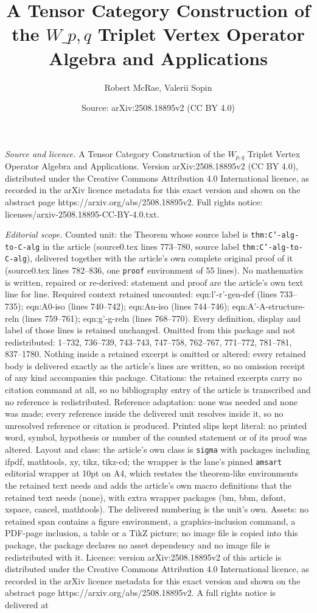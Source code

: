 \documentclass[10pt,a4paper]{amsart}
\title[A Tensor Category Construction of the $W\_{p,q}$ Triplet Vert]{A Tensor Category Construction of the $W\_{p,q}$ Triplet Vertex Operator Algebra and Applications}
\author{Robert McRae, Valerii Sopin}
\date{Source: arXiv:2508.18895v2 (CC BY 4.0)}
\begin{document}
\maketitle

\noindent\emph{Source and licence.} A Tensor Category Construction of the $W_{p,q}$ Triplet Vertex Operator Algebra and Applications. Version arXiv:2508.18895v2 (CC BY 4.0), distributed under the Creative Commons Attribution 4.0 International licence, as recorded in the arXiv licence metadata for this exact version and shown on the abstract page https://arxiv.org/abs/2508.18895v2. Full rights notice: licenses/arxiv-2508.18895-CC-BY-4.0.txt.\par\smallskip

\noindent\textit{Editorial scope.} Counted unit: the Theorem whose source label is \texttt{thm:C'-alg-to-C-alg} in the article (source0.tex lines 773--780, source label \texttt{thm:C'-alg-to-C-alg}), delivered together with the article's own complete original proof of it (source0.tex lines 782--836, one \texttt{proof} environment of 55 lines). No mathematics is written, repaired or re-derived: statement and proof are the article's own text line for line. Required context retained uncounted: eqn:l'-r'-gen-def (lines 733--735); eqn:A0-iso (lines 740--742); eqn:An-iso (lines 744--746); eqn:A'-A-structure-reln (lines 759--761); eqn:g'-g-reln (lines 768--770). Every definition, display and label of those lines is retained unchanged. Omitted from this package and not redistributed: 1--732, 736--739, 743--743, 747--758, 762--767, 771--772, 781--781, 837--1780. Nothing inside a retained excerpt is omitted or altered: every retained body is delivered exactly as the article's lines are written, so no omission receipt of any kind accompanies this package. Citations: the retained excerpts carry no citation command at all, so no bibliography entry of the article is transcribed and no reference is redistributed. Reference adaptation: none was needed and none was made; every reference inside the delivered unit resolves inside it, so no unresolved reference or citation is produced. Printed slips kept literal: no printed word, symbol, hypothesis or number of the counted statement or of its proof was altered. Layout and class: the article's own class is \texttt{sigma} with packages including ifpdf, mathtools, xy, tikz, tikz-cd; the wrapper is the lane's pinned \texttt{amsart} editorial wrapper at 10pt on A4, which restates the theorem-like environments the retained text needs and adds the article's own macro definitions that the retained text needs (none), with extra wrapper packages (bm, bbm, dsfont, xspace, cancel, mathtools). The delivered numbering is the unit's own. Assets: no retained span contains a figure environment, a graphics-inclusion command, a PDF-page inclusion, a table or a TikZ picture; no image file is copied into this package, the package declares no asset dependency and no image file is redistributed with it. Licence: version arXiv:2508.18895v2 of this article is distributed under the Creative Commons Attribution 4.0 International licence, as recorded in the arXiv licence metadata for this exact version and shown on the abstract page https://arxiv.org/abs/2508.18895v2. A full rights notice is delivered at 
\end{document}
